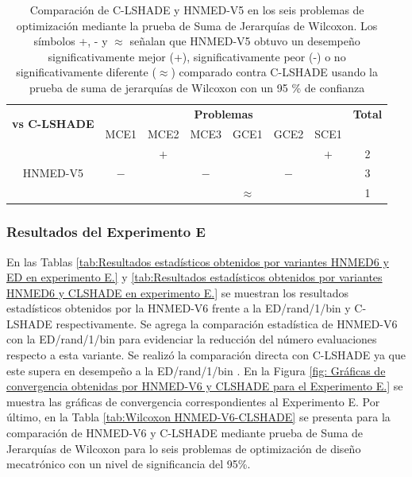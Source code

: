 \begin{table}
	\centering
	\caption[Comparación de C-LSHADE y HNMED-V5 en los seis problemas de optimización mediante la prueba de Suma de Jerarquías de Wilcoxon.]{Comparación de C-LSHADE y HNMED-V5 en los seis problemas de optimización mediante la prueba de Suma de Jerarquías de Wilcoxon. Los símbolos +, - y $\approx$ señalan que HNMED-V5 obtuvo un desempeño significativamente mejor (+), significativamente peor (-) o no significativamente diferente ($\approx$) comparado contra C-LSHADE usando la prueba de suma de jerarquías de Wilcoxon con un 95 \% de confianza} \label{tab:Wilcoxon HNMED-V5-CLSHADE}
	\begin{tabular}{cccccccc}
		\multirow{2}{*}{\textbf{vs C-LSHADE}} & \multicolumn{6}{c}{\textbf{Problemas}}           & \textbf{Total}  \\
		& MCE1 & MCE2 & MCE3 & GCE1 & GCE2 & SCE1 &        \\
		\hline
		\multirow{3}{*}{HNMED-V5}    &      &  $+$    &      &      &       & $ +$    &  2      \\
		&   $-$  &      &  $ -$   &      &  $ - $  &       & 3       \\
		&      &      &       &$\approx$ &  &        &    1
	\end{tabular}
\end{table}


\subsubsection{Resultados del Experimento E}
En las Tablas \ref{tab:Resultados estadísticos obtenidos por variantes HNMED6 y ED  en experimento E.} y \ref{tab:Resultados estadísticos obtenidos por variantes HNMED6 y CLSHADE  en experimento E.} se muestran los resultados estadísticos obtenidos por la HNMED-V6 frente a la ED/rand/1/bin y C-LSHADE respectivamente. Se agrega la comparación estadística de HNMED-V6 con la ED/rand/1/bin para evidenciar la reducción del número evaluaciones respecto a esta variante. Se realizó la comparación directa con C-LSHADE ya que este supera en desempeño a la ED/rand/1/bin \cite{zapata_zapata_control_2017}. En la Figura \ref{fig: Gráficas de convergencia obtenidas por HNMED-V6 y CLSHADE para el Experimento E.} se muestra las gráficas de convergencia correspondientes al Experimento E. Por último, en la Tabla \ref{tab:Wilcoxon HNMED-V6-CLSHADE} se presenta para la comparación de HNMED-V6 y C-LSHADE mediante prueba de Suma de Jerarquías de Wilcoxon  para lo seis problemas de optimización de diseño mecatrónico con un nivel de significancia del 95\%.  

